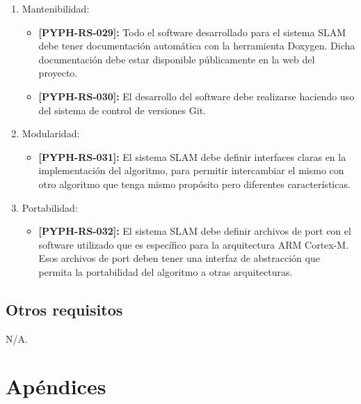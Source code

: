 \documentclass[12pt,a4paper, twosite]{article}
\begin{document}
\begin{enumerate}
  \item Mantenibilidad:
  \begin{itemize}
    \item \textbf{[PYPH-RS-029]:} Todo el software desarrollado para el sistema SLAM debe
    tener documentación automática con la herramienta Doxygen. Dicha documentación debe estar
    disponible públicamente en la web del proyecto.
    \item \textbf{[PYPH-RS-030]:} El desarrollo del software debe realizarse haciendo uso del
    sistema de control de versiones Git.
  \end{itemize}
  \item Modularidad:
  \begin{itemize}
    \item \textbf{[PYPH-RS-031]:} El sistema SLAM debe definir interfaces claras en la
    implementación del algoritmo, para permitir intercambiar el mismo con otro algoritmo
    que tenga mismo propósito pero diferentes características.
  \end{itemize}
  \item Portabilidad:
  \begin{itemize}
    \item \textbf{[PYPH-RS-032]:} El sistema SLAM debe definir archivos de port con el
    software utilizado que es específico para la arquitectura ARM Cortex-M. Esos archivos de
    port deben tener una interfaz de abstracción que permita la portabilidad del algoritmo
    a otras arquitecturas.
  \end{itemize}
\end{enumerate}



\subsection{Otros requisitos}
\label{sec:org31d2978}


N/A.

\newpage


\section{Apéndices}
\label{sec:org75cea03}




\end{document}

